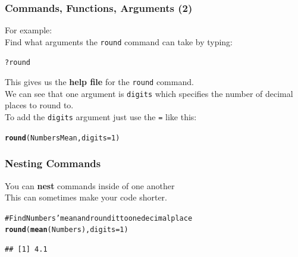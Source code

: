 \documentclass{beamer}\usepackage{graphicx, color}
\makeatletter
\newcommand{\hlfunctioncall}[1]{\textcolor[rgb]{0.501960784313725,0,0.329411764705882}{\textbf{#1}}}%
\newcommand{\hlcomment}[1]{\textcolor[rgb]{0.180392156862745,0.6,0.341176470588235}{#1}}%
\newenvironment{kframe}{%
 \def\at@end@of@kframe{}%
 \ifinner\ifhmode%
  \def\at@end@of@kframe{\end{minipage}}%
  \begin{minipage}{\columnwidth}%
 \fi\fi%
 \def\FrameCommand##1{\hskip\@totalleftmargin \hskip-\fboxsep
 \colorbox{shadecolor}{##1}\hskip-\fboxsep
     \hskip-\linewidth \hskip-\@totalleftmargin \hskip\columnwidth}%
 \MakeFramed {\advance\hsize-\width
   \@totalleftmargin\z@ \linewidth\hsize
   \@setminipage}}%
 {\par\unskip\endMakeFramed%
 \at@end@of@kframe}
\newenvironment{knitrout}{}{} %
\makeatother
\begin{document}

\begin{frame}[fragile]
  \frametitle{Commands, Functions, Arguments (2)}
  {\LARGE{For example:}} \\[0.5cm]
  Find what arguments the {\tt{round}} command can take by typing:
\begin{knitrout}
\color{fgcolor}\begin{kframe}
\begin{alltt}
?round
\end{alltt}
\end{kframe}
\end{knitrout}


  This gives us the {\bf{help file}} for the {\tt{round}} command. \\[0.25cm]

  We can see that one argument is {\tt{digits}} which specifies the number of decimal places to round to. \\ [0.25cm]

  To add the {\tt{digits}} argument just use the {\tt{=}} like this:

\begin{kframe}
\begin{alltt}
\hlfunctioncall{round}(NumbersMean, digits = 1)
\end{alltt}
\end{kframe}
[1] 4.1



\end{frame}

\begin{frame}[fragile]
  \frametitle{Nesting Commands}
  You can {\bf{nest}} commands inside of one another \\[0.5cm]
  This can sometimes make your code shorter.
\begin{knitrout}
\color{fgcolor}\begin{kframe}
\begin{alltt}
\hlcomment{# Find Numbers' mean and round it to one decimal place}
\hlfunctioncall{round}(\hlfunctioncall{mean}(Numbers), digits = 1)
\end{alltt}
\begin{verbatim}
## [1] 4.1
\end{verbatim}
\end{kframe}
\end{knitrout}

\end{frame}
\end{document}
